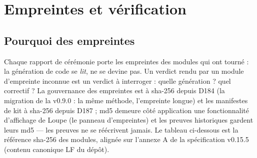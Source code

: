 \section{Empreintes et vérification}\label{sec:empreintslivre}

\subsection{Pourquoi des empreintes}

Chaque rapport de cérémonie porte les empreintes des modules qui ont tourné : la
génération de code se \emph{lit}, ne se devine pas. Un verdict rendu par un module
d'empreinte inconnue est un verdict à interroger : quelle génération ? quel correctif
? La gouvernance des empreintes est à sha-256 depuis D184 (la migration de la
v0.9.0 : la même méthode, l'empreinte longue) et les manifestes de kit à sha-256
depuis D187 ; md5 demeure côté application une fonctionnalité d'affichage de
Loupe (le panneau d'empreintes) et les preuves historiques gardent leurs md5 —
les preuves ne se réécrivent jamais. Le tableau ci-dessous est la référence
sha-256 des modules, alignée sur l'annexe A de la spécification v0.15.5
(contenu canonique LF du dépôt).

